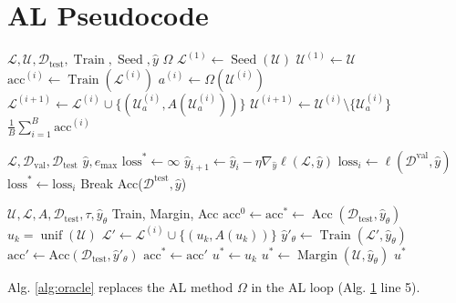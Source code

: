 \documentclass[]{article}
\newcommand{\D}{\mathcal{D}}
\newcommand{\U}{\mathcal{U}}
\newcommand{\LL}{\mathcal{L}}
\newcommand{\test}{\text{test}}
\begin{document}
\section{AL Pseudocode}\label{app:pseudocode}
\begin{algorithm}[H]
	\caption{Active Learning Loop}\label{alg:active_learning}
	\begin{algorithmic}[1]
		\Require $\LL, \U, \D_\text{test}, \operatorname{Train}, \operatorname{Seed}, \hat y$
		\Require $\Omega$ 
		\State $\LL^{(1)} \gets \operatorname{Seed}(\U)$  
		\State $\U^{(1)} \gets \U$
		\State $\text{acc}^{(i)} \gets \operatorname{Train}(\LL^{(i)})$ 
		\State $a^{(i)} \gets \Omega(\mathcal{U}^{(i)})$ 
		\State $\mathcal{L}^{(i+1)} \gets \mathcal{L}^{(i)} \cup \{(\U^{(i)}_a, A(\U^{(i)}_{a}))\}$
		\State $\U^{(i+1)} \gets \U^{(i)} \setminus \{\U^{(i)}_a\}$
		\EndFor
		\State
		\Return $\frac{1}{B} \sum_{i=1}^{B} \text{acc}^{(i)}$
	\end{algorithmic}
\end{algorithm}

\begin{algorithm}[H]
	\caption{Retrain}\label{alg:retrain}
	\begin{algorithmic}[1]
		\Require $\LL, \D_\text{val}, \D_\text{test}$
		\Require $\hat y, e_\text{max}$
		\State $\text{loss}^* \gets \infty$
		\State $\hat y_{i+1} \gets \hat y_i - \eta \nabla_{\hat y} \ell(\mathcal{L}, \hat y)$
		\State $\text{loss}_i \gets \ell(\mathcal{D}^\text{val}, \hat y)$
		\State $\text{loss}^* \gets \text{loss}_i$
		\Else
		\State Break
		\EndIf
		\EndFor
		\State
		\Return Acc($\mathcal{D}^\text{test}, \hat y$)
	\end{algorithmic}
\end{algorithm}

\begin{algorithm}[H]
	\caption{Acquire Oracle $\Omega$}\label{alg:oracle}
	\begin{algorithmic}[1]
		\Require $\mathcal{U}, \mathcal{L}, A, \mathcal{D}_\text{test}, \tau, \hat y_\theta$ 
		\Require Train, Margin, Acc
		\State $\text{acc}^0 \gets \text{acc}^* \gets \operatorname{Acc}(\mathcal{D}_\text{test}, \hat y_\theta)$ 
		\State $u_k = \operatorname{unif}(\U)$
		\State $\mathcal{L}' \gets \mathcal{L}^{(i)} \cup \{(u_k, A(u_k))\}$
		\State $\hat y'_\theta \gets \operatorname{Train}(\mathcal{L}', \hat y_\theta)$
		\State $\text{acc}' \gets \text{Acc}(\D_\test, \hat y'_\theta)$
		\State $\text{acc}^* \gets \text{acc}'$
		\State $u^* \gets u_k$
		\EndIf
		\EndFor
		\State $u^* \gets \operatorname{Margin}(\mathcal{U}, \hat y_\theta)$
		\EndIf
		\Return $u^*$
	\end{algorithmic}
\end{algorithm}
Alg. \ref{alg:oracle} replaces the AL method $\Omega$ in the AL loop (Alg. \ref{app:pseudocode} line 5). 
\end{document}
